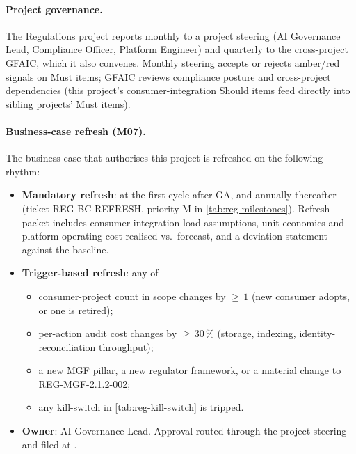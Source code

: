 \paragraph{Project governance.}
The Regulations project reports monthly to a project steering (AI
Governance Lead, Compliance Officer, Platform Engineer) and quarterly
to the cross-project GFAIC, which it also convenes. Monthly steering
accepts or rejects amber/red signals on Must items; GFAIC reviews
compliance posture and cross-project dependencies (this project's
consumer-integration Should items feed directly into sibling projects'
Must items).

\paragraph{Business-case refresh (M07).}
The business case that authorises this project is refreshed on the
following rhythm:

\begin{itemize}
  \item \textbf{Mandatory refresh}: at the first cycle after GA, and
        annually thereafter (ticket REG-BC-REFRESH, priority M in
        \cref{tab:reg-milestones}). Refresh packet includes consumer
        integration load assumptions, unit economics
        and platform operating cost
        realised vs.\ forecast, and a deviation statement against the
        baseline.
  \item \textbf{Trigger-based refresh}: any of
        \begin{itemize}
          \item consumer-project count in scope changes by $\ge\,1$
                (new consumer adopts, or one is retired);
          \item per-action audit cost changes by $\ge\,30$\,\%
                (storage, indexing, identity-reconciliation throughput);
          \item a new MGF pillar, a new regulator framework, or a
                material change to REG-MGF-2.1.2-002;
          \item any kill-switch in \cref{tab:reg-kill-switch} is
                tripped.
        \end{itemize}
  \item \textbf{Owner}: AI Governance Lead. Approval routed through
        the project steering and filed at
        .
\end{itemize}
